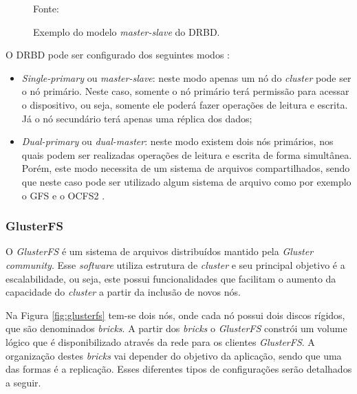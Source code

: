 \begin{figure}[h!]
 \centering
 \caption{Exemplo do modelo \textit{master-slave} do \ac{DRBD}.}
 Fonte: \citet{jones2010}
 \label{fig:drbd_basic}
\end{figure}

O \ac{DRBD} pode ser configurado dos seguintes modos \cite{drbd}:
\begin{itemize}
 \item \textit{Single-primary} ou \textit{master-slave}: neste modo apenas um nó do \textit{cluster} pode ser o nó primário. Neste caso, somente
 o nó primário terá permissão para acessar o dispositivo, ou seja, somente ele poderá fazer operações de leitura e escrita. Já o nó 
 secundário terá apenas uma réplica dos dados;
 \item \textit{Dual-primary} ou \textit{dual-master}: neste modo existem dois nós primários, nos quais podem ser realizadas operações de leitura e 
 escrita de forma simultânea. Porém, este modo necessita de um sistema de arquivos compartilhados, sendo que neste caso pode ser utilizado algum 
 sistema de arquivo como por exemplo o \ac{GFS} \cite{gfs} e o \ac{OCFS2} \cite{ocfs2}.
\end{itemize}

\subsubsection{GlusterFS}
\label{section:glusterfs}
O \textit{GlusterFS} \cite{glusterfs} é um sistema de arquivos distribuídos mantido pela \textit{Gluster community}. Esse \textit{software} 
utiliza estrutura de \textit{cluster} e seu principal objetivo é a escalabilidade, ou seja, este possui funcionalidades que facilitam o aumento
da capacidade do \textit{cluster} a partir da inclusão de novos nós.

Na Figura \ref{fig:glusterfs} tem-se dois nós, onde cada nó possui dois discos rígidos, que são denominados \textit{bricks}. 
A partir dos \textit{bricks} o \textit{GlusterFS} constrói um volume lógico que é disponibilizado através da rede para os clientes 
\textit{GlusterFS}. A organização destes \textit{bricks} vai depender do objetivo da aplicação, sendo que uma das formas é a replicação. Esses 
diferentes tipos de configurações serão detalhados a seguir.

